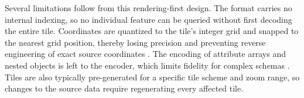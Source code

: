 Several limitations follow from this rendering-first design. The format carries no internal indexing, so no individual feature can be queried without first decoding the entire tile. Coordinates are quantized to the tile's integer grid and snapped to the nearest grid position, thereby losing precision and preventing reverse engineering of exact source coordinates \parencite{mapbox2017_vector_tile_specification_21}. The encoding of attribute arrays and nested objects is left to the encoder, which limits fidelity for complex schemas \parencite{mapbox2017_vector_tile_specification_21}. Tiles are also typically pre-generated for a specific tile scheme and zoom range, so changes to the source data require regenerating every affected tile.




